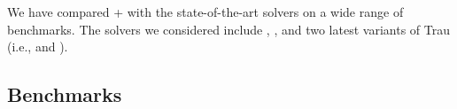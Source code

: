 
We have compared {\ostrich}+ with the state-of-the-art solvers on a wide range of benchmarks. The solvers we considered include {\cvc} \cite{cvc4}, {\zthree} \cite{Z3-str}, and two latest variants of Trau (i.e., {\trauplus} \cite{AbdullaA+19} and {\zthreetrau} \cite{Z3-trau}). 



\subsection{Benchmarks}
 


